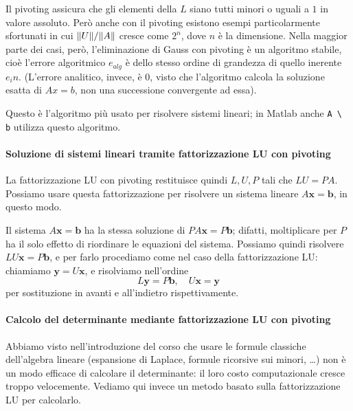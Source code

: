 \documentclass[a4paper]{report}
\DeclarePairedDelimiter{\norm}{\lVert}{\rVert}
\theoremstyle{definiton}
\theoremstyle{remark}
\newcommand{\x}{\mathbf{x}}
\renewcommand{\b}{\mathbf{b}}
\begin{document}
Il pivoting assicura che gli elementi della $L$ siano tutti minori o uguali a $1$ in valore assoluto. Però anche con il pivoting esistono esempi particolarmente sfortunati in cui $\norm{U}/\norm{A}$ cresce come $2^n$, dove $n$ è la dimensione. Nella maggior parte dei casi, però, l'eliminazione di Gauss con pivoting è un algoritmo stabile, cioè l'errore algoritmico $e_{alg}$ è dello stesso ordine di grandezza di quello inerente $e_in$. (L'errore analitico, invece, è $0$, visto che l'algoritmo calcola la soluzione esatta di $Ax=b$, non una successione convergente ad essa).

Questo è l'algoritmo più usato per risolvere sistemi lineari; in Matlab anche \lstinline{A \ b} utilizza questo algoritmo.

\paragraph{Soluzione di sistemi lineari tramite fattorizzazione LU con pivoting}

La fattorizzazione LU con pivoting restituisce quindi $L,U,P$ tali che $LU = PA$. Possiamo usare questa fattorizzazione per risolvere un sistema lineare $A\x=\b$, in questo modo.

Il sistema $A\x = \b$ ha la stessa soluzione di $PA\x = P\b$; difatti, moltiplicare per $P$ ha il solo effetto di riordinare le equazioni del sistema. Possiamo quindi risolvere $LU\x=P\b$, e per farlo procediamo come nel caso della fattorizzazione LU: chiamiamo $\mathbf{y}=U\x$, e risolviamo nell'ordine
\[
L\mathbf{y} = P\b, \quad U\x = \mathbf{y}
\]
per sostituzione in avanti e all'indietro rispettivamente.

\paragraph{Calcolo del determinante mediante fattorizzazione LU con pivoting} Abbiamo visto nell'introduzione del corso che usare le formule classiche dell'algebra lineare (espansione di Laplace, formule ricorsive sui minori, \dots) non è un modo efficace di calcolare il determinante: il loro costo computazionale cresce troppo velocemente. Vediamo qui invece un metodo basato sulla fattorizzazione LU per calcolarlo.
\end{document}
